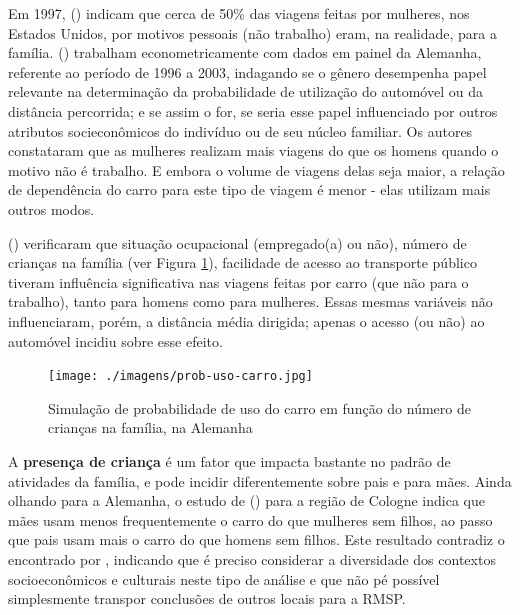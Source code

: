 

Em 1997,  (\citeyear{ROOT1999}) indicam que cerca de 50\% das viagens feitas por mulheres, nos Estados Unidos, por motivos pessoais (não trabalho) eram, na realidade, para a família.
 (\citeyear{VANCE2007}) trabalham econometricamente com dados em painel da Alemanha, referente ao período de 1996 a 2003, indagando se o gênero desempenha papel relevante na determinação da probabilidade de utilização do automóvel ou da distância percorrida; e se assim o for, se seria esse papel influenciado por outros atributos socieconômicos do indivíduo ou de seu núcleo familiar. 
Os autores constataram que as mulheres realizam mais viagens do que os homens quando o motivo não é trabalho. E embora o volume de viagens delas seja maior, a relação de dependência do carro para este tipo de viagem é menor - elas utilizam mais outros modos.




 (\citeyear{VANCE2007}) verificaram que situação ocupacional (empregado(a) ou não), número de crianças na família (ver Figura \ref{fig:prob-uso-carro}), facilidade de acesso ao transporte público tiveram influência significativa nas viagens feitas por carro (que não para o trabalho), tanto para homens como para mulheres. Essas mesmas variáveis não influenciaram, porém, a distância média dirigida; apenas o acesso (ou não) ao automóvel incidiu sobre esse efeito. 

\begin{figure}[htb]%
    \caption{\label{fig:prob-uso-carro}Simulação de probabilidade de uso do carro em função do número de crianças na família, na Alemanha}%
    \begin{center}%
        \texttt{[image: ./imagens/prob-uso-carro.jpg]}%
    \end{center}%
\end{figure}%

A \textbf{presença de criança} é um fator que impacta bastante no padrão de atividades da família, e pode incidir diferentemente sobre pais e para mães. Ainda olhando para a Alemanha, o estudo de  (\citeyear{BEST2005}) para a região de Cologne indica que mães usam menos frequentemente o carro do que mulheres sem filhos, ao passo que pais usam mais o carro do que homens sem filhos.
Este resultado contradiz o encontrado por , indicando que é preciso considerar a diversidade dos contextos socioeconômicos e culturais neste tipo de análise e que não pé possível simplesmente transpor conclusões de outros locais para a RMSP.

